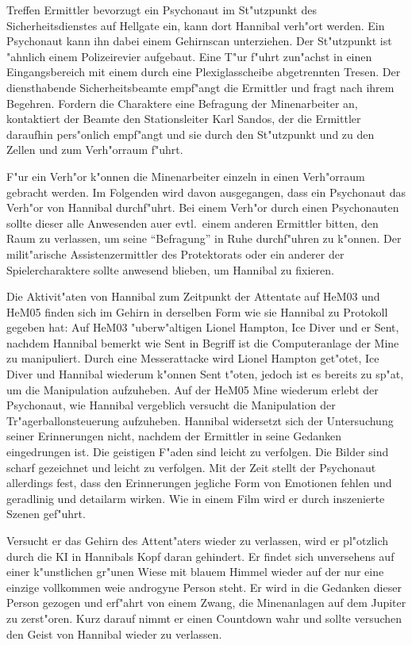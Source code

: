 
Treffen Ermittler bevorzugt ein Psychonaut im St"utzpunkt des Sicherheitsdienstes auf Hellgate ein, kann dort Hannibal verh"ort werden. Ein Psychonaut kann ihn dabei einem Gehirnscan unterziehen. Der St"utzpunkt ist "ahnlich einem Polizeirevier aufgebaut. Eine T"ur f"uhrt zun"achst in einen Eingangsbereich mit einem durch eine Plexiglasscheibe abgetrennten Tresen. Der diensthabende Sicherheitsbeamte empf"angt die Ermittler und fragt nach ihrem Begehren. Fordern die Charaktere eine Befragung der Minenarbeiter an, kontaktiert der Beamte den Stationsleiter Karl Sandos, der die Ermittler daraufhin pers"onlich empf"angt und sie durch den St"utzpunkt und zu den Zellen und zum Verh"orraum f"uhrt.

F"ur ein Verh"or k"onnen die Minenarbeiter einzeln in einen Verh"orraum gebracht werden. Im Folgenden wird davon ausgegangen, dass ein Psychonaut das Verh"or von Hannibal durchf"uhrt. Bei einem Verh"or durch einen Psychonauten sollte dieser alle Anwesenden au\3er evtl.~einem anderen Ermittler bitten, den Raum zu verlassen, um seine ``Befragung'' in Ruhe durchf"uhren zu k"onnen. Der milit"arische Assistenzermittler des Protektorats oder ein anderer der Spielercharaktere sollte anwesend blieben, um Hannibal zu fixieren. 

Die Aktivit"aten von Hannibal zum Zeitpunkt der Attentate auf HeM03 und HeM05 finden sich im Gehirn in derselben Form wie sie Hannibal zu Protokoll gegeben hat: Auf HeM03 "uberw"altigen Lionel Hampton, Ice Diver und er Sent, nachdem Hannibal bemerkt wie Sent in Begriff ist die Computeranlage der Mine zu manipuliert. Durch eine Messerattacke wird Lionel Hampton get"otet, Ice Diver und Hannibal wiederum k"onnen Sent t"oten, jedoch ist es bereits zu sp"at, um die Manipulation aufzuheben. Auf der HeM05 Mine wiederum erlebt der Psychonaut, wie Hannibal vergeblich versucht die Manipulation der Tr"agerballonsteuerung aufzuheben. Hannibal widersetzt sich der Untersuchung seiner Erinnerungen nicht, nachdem der Ermittler in seine Gedanken eingedrungen ist. Die geistigen F"aden sind leicht zu verfolgen. Die Bilder sind scharf gezeichnet und leicht zu verfolgen. Mit der Zeit stellt der Psychonaut allerdings fest, dass den Erinnerungen jegliche Form von Emotionen fehlen und geradlinig und detailarm wirken. Wie in einem Film wird er durch inszenierte Szenen gef"uhrt. 

Versucht er das Gehirn des Attent"aters wieder zu verlassen, wird er pl"otzlich durch die KI in Hannibals Kopf daran gehindert. Er findet sich unversehens auf einer k"unstlichen gr"unen Wiese mit blauem Himmel wieder auf der nur eine einzige vollkommen wei\3e androgyne Person steht. Er wird in die Gedanken dieser Person gezogen und erf"ahrt von einem Zwang, die Minenanlagen auf dem Jupiter zu zerst"oren. Kurz darauf nimmt er einen Countdown wahr und sollte versuchen den Geist von Hannibal wieder zu verlassen.

